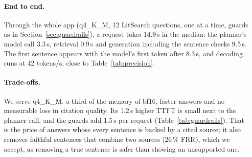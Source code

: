 \paragraph{End to end.}
Through the whole app (q4\_K\_M, 12 LitSearch questions, one at a time, guards as in Section~\ref{sec:guardrails}), a request takes 14.9\,s in the median: the planner's model call 3.3\,s, retrieval 0.9\,s and generation including the sentence checks 9.5\,s.
The first sentence appears with the model's first token after 8.3\,s, and decoding runs at 42 tokens/s, close to Table~\ref{tab:precision}.

\paragraph{Trade-offs.}
We serve q4\_K\_M: a third of the memory of bf16, faster answers and no measurable loss in citation quality.
Its 1.2\,s higher TTFT is small next to the planner call, and the guards add 1.5\,s per request (Table~\ref{tab:guardrails}).
That is the price of answers whose every sentence is backed by a cited source; it also removes faithful sentences that combine two sources (26\,\% FRR), which we accept, as removing a true sentence is safer than showing an unsupported one.
